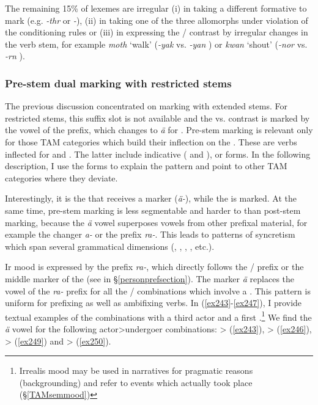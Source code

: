 The remaining 15\% of  lexemes are irregular (i) in taking a different formative to mark  (e.g. \emph{-thr} or \emph{-\Zero}), (ii) in taking one of the three allomorphs under violation of the conditioning rules or (iii) in expressing the / contrast by irregular changes in the verb stem, for example \emph{moth} `walk' (\emph{-yak} {\Ndu} vs. \emph{-yan} \Du) or \emph{kwan} `shout' (\emph{-nor} {\Ndu} vs. \emph{-rn} \Du).

\subsubsection{Pre-stem dual marking with restricted stems} \label{prerootdual}

The previous discussion concentrated on  marking with extended stems. For restricted stems, this suffix slot is not available and the  vs.  contrast is marked by the vowel of the prefix, which changes to \emph{ä} for . Pre-stem  marking is relevant only for those TAM categories which build their inflection on the . These are verbs inflected for  and  . The latter include indicative ( and  ),  or  forms. In the following description, I use the   forms to explain the pattern and point to other TAM categories where they deviate.

Interestingly, it is the  that receives a marker (\emph{ä-}), while the  is  marked. At the same time, pre-stem  marking is less segmentable and harder to  than post-stem  marking, because the  \emph{ä} vowel superposes vowels from other prefixal material, for example the  changer \emph{a-} or the  prefix \emph{ra-}. This leads to patterns of syncretism which span several grammatical dimensions (, , , , etc.).

Ir mood is expressed by the prefix \emph{ra-}, which directly follows the / prefix or the middle marker of the \Bet{}  (see  in {\S}\ref{personprefsection}). The  marker \emph{ä} replaces the vowel of the \emph{ra-} prefix for all the / combinations which involve a  . This pattern is uniform for prefixing as well as ambifixing verbs. In (\ref{ex243}-\ref{ex247}), I provide textual examples of the  combinations with a third  actor and a first  .\footnote{Irrealis mood may be used in narratives for pragmatic reasons (backgrounding) and refer to events which actually took place ({\S}\ref{TAMsemmood})} We find the \emph{ä} vowel for the following actor>undergoer combinations: \Sg>{\Sg} (\ref{ex243}), \Pl>{\Sg} (\ref{ex246}), \Sg>{\Pl} (\ref{ex249}) and \Pl>{\Pl} (\ref{ex250}).

